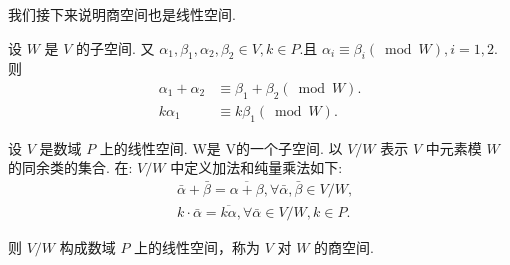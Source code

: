 \documentclass{ctexart}
\begin{document}
我们接下来说明商空间也是线性空间. 

\begin{theorem}
设 $W$ 是 $V$ 的子空间. 又 $\alpha_1, \beta_1, \alpha_2, \beta_2 \in V, k \in P$.且 $\alpha_i \equiv \beta_i(\bmod W), i=1,2$. 则
$$
\begin{aligned}
\alpha_1+\alpha_2 & \equiv \beta_1+\beta_2(\bmod W) . \\
k \alpha_1 & \equiv k \beta_1(\bmod W) .
\end{aligned}
$$
    
\end{theorem}

\begin{theorem}
 设 $V$ 是数域 $P$ 上的线性空间. W是 V的一个子空间. 以 $V / W$ 表示 $V$ 中元素模 $W$ 的同余类的集合. 在: $V / W$ 中定义加法和纯量乘法如下:
$$
\begin{aligned}
& \bar{\alpha}+\bar{\beta}=\overline{\alpha+\beta}, \forall \bar{\alpha}, \bar{\beta} \in V / W, \\
& k \cdot \bar{\alpha}=\overline{k \alpha}, \forall \bar{\alpha} \in V / W, k \in P .
\end{aligned}
$$

则 $V / W$ 构成数域 $P$ 上的线性空间，称为 $V$ 对 $W$ 的商空间.
\end{theorem}
\end{document}
